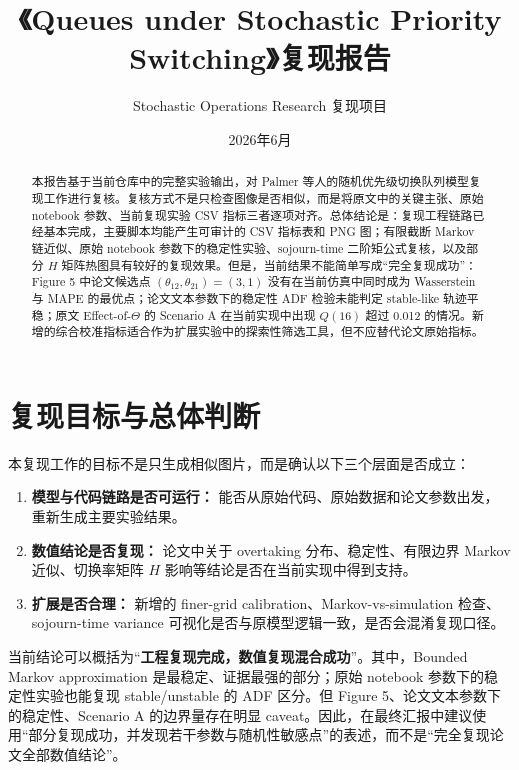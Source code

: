\documentclass[UTF8,a4paper,11pt]{ctexart}
\title{《Queues under Stochastic Priority Switching》复现报告}
\author{Stochastic Operations Research 复现项目}
\date{2026年6月}
\begin{document}
\maketitle

\begin{abstract}
本报告基于当前仓库中的完整实验输出，对 Palmer 等人的随机优先级切换队列模型复现工作进行复核。复核方式不是只检查图像是否相似，而是将原文中的关键主张、原始 notebook 参数、当前复现实验 CSV 指标三者逐项对齐。总体结论是：复现工程链路已经基本完成，主要脚本均能产生可审计的 CSV 指标表和 PNG 图；有限截断 Markov 链近似、原始 notebook 参数下的稳定性实验、sojourn-time 二阶矩公式复核，以及部分 $H$ 矩阵热图具有较好的复现效果。但是，当前结果不能简单写成“完全复现成功”：Figure 5 中论文候选点 $(\theta_{12},\theta_{21})=(3,1)$ 没有在当前仿真中同时成为 Wasserstein 与 MAPE 的最优点；论文文本参数下的稳定性 ADF 检验未能判定 stable-like 轨迹平稳；原文 Effect-of-$\Theta$ 的 Scenario A 在当前实现中出现 $Q(16)$ 超过 0.012 的情况。新增的综合校准指标适合作为扩展实验中的探索性筛选工具，但不应替代论文原始指标。
\end{abstract}

\tableofcontents
\newpage

\section{复现目标与总体判断}

本复现工作的目标不是只生成相似图片，而是确认以下三个层面是否成立：

\begin{enumerate}
  \item \textbf{模型与代码链路是否可运行：} 能否从原始代码、原始数据和论文参数出发，重新生成主要实验结果。
  \item \textbf{数值结论是否复现：} 论文中关于 overtaking 分布、稳定性、有限边界 Markov 近似、切换率矩阵 $H$ 影响等结论是否在当前实现中得到支持。
  \item \textbf{扩展是否合理：} 新增的 finer-grid calibration、Markov-vs-simulation 检查、sojourn-time variance 可视化是否与原模型逻辑一致，是否会混淆复现口径。
\end{enumerate}

当前结论可以概括为“\textbf{工程复现完成，数值复现混合成功}”。其中，Bounded Markov approximation 是最稳定、证据最强的部分；原始 notebook 参数下的稳定性实验也能复现 stable/unstable 的 ADF 区分。但 Figure 5、论文文本参数下的稳定性、Scenario A 的边界量存在明显 caveat。因此，在最终汇报中建议使用“部分复现成功，并发现若干参数与随机性敏感点”的表述，而不是“完全复现论文全部数值结论”。
\end{document}
